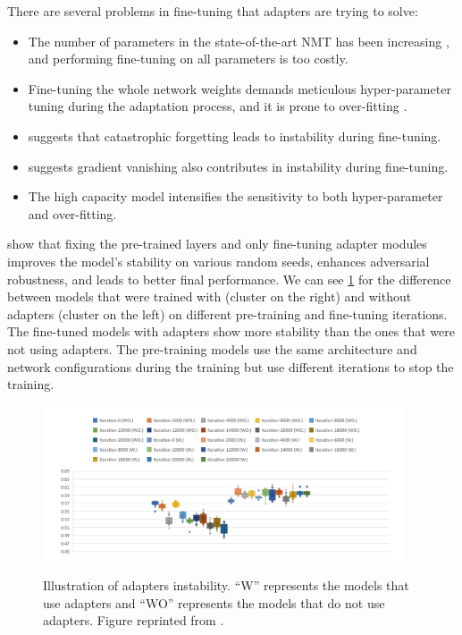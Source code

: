 There are several problems in fine-tuning that adapters are trying to solve:
\begin{itemize}
    \item The number of parameters in the state-of-the-art NMT has been increasing , and performing fine-tuning on all parameters is too costly.
    \item Fine-tuning the whole network weights demands meticulous hyper-parameter tuning during the adaptation process, and it is prone to over-fitting .
    \item {} suggests that catastrophic forgetting leads to instability during fine-tuning.
    \item {} suggests gradient vanishing also contributes in instability during fine-tuning.
    \item The high capacity model intensifies the sensitivity to both hyper-parameter and over-fitting.
\end{itemize}

 show that fixing the pre-trained layers and only fine-tuning adapter modules improves the model's stability on various random seeds, enhances adversarial robustness, and leads to better final performance. We can see \cref{img:adapters_instability} for the difference between models that were trained with (cluster on the right) and without adapters (cluster on the left) on different pre-training and fine-tuning iterations. The fine-tuned models with adapters show more stability than the ones that were not using adapters. The pre-training models use the same architecture and network configurations during the training but use different iterations to stop the training.

\begin{figure}[h]
    {\includegraphics[width=0.95\textwidth]{img/adapters_instability.png}}
    \centering
    \caption{Illustration of adapters instability. ``W'' represents the models that use adapters and ``WO'' represents the models that do not use adapters. Figure reprinted from \cite{han2021robust}.}
    \label{img:adapters_instability}
\end{figure}